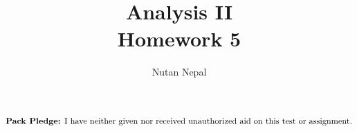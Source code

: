 \documentclass[12pt]{article}
\title{Analysis II \\
\large Homework 5
}
\author{Nutan Nepal}
\newcommand{\packpledge}{
    $\text{{\bf Pack Pledge:} I have neither given nor
    received unauthorized aid on this
    test or assignment.}$}
\begin{document}
\maketitle
\packpledge\\
\makebox[\linewidth]{\rule{200mm}{1pt}}
\vspace{1mm}


\newcommand{\mR}{\mathbb{R}}
\newcommand{\mM}{\mathcal{M}}
\newcommand{\mN}{\mathbb{N}}
\newcommand{\mC}{\mathbb{C}}
\newcommand{\mQ}{\mathbb{Q}}
\newcommand{\cP}{\mathcal{P}}
\newcommand{\cB}{\mathcal{B}}
\newcommand{\cM}{\mathcal{M}}
\newcommand{\ds}{\displaystyle}
\newcommand{\al}{\alpha}
\newcommand{\li}{l^{\infty}}
\newcommand{\ep}{\varepsilon}
\newcommand{\de}{\delta}
\newcommand{\T}{\mathcal{T}}
\newcommand{\linf}{l^{\infty}}
\newcommand{\cD}{\mathcal{D}}
\newcommand{\cR}{\mathcal{R}}
\newcommand{\cN}{\mathcal{N}}
\newcommand{\lsn}{\limsup_{n \to \infty}}
\newcommand{\lin}{\liminf_{n \to \infty}}
\newcommand{\dmu}{\ d\mu}
\newcommand{\ix}{\int_X}
\newcommand{\cL}{\mathcal{L}(\mathbb{R})}
\newcommand{\soi}{\sum_{i=1}^{\infty}}
\newcommand{\son}{\sum_{i=1}^{n}}
\newcommand{\la}{\lambda}
\newcommand{\Lp}{L^p(\mu)}
\newcommand{\Lq}{L^q(\mu)}
\newcommand{\Lr}{L^r(\mu)}
\newcommand{\ms}{(X, \mM, \mu)}
\newcommand{\outm}{\mu^*}
\end{document}
